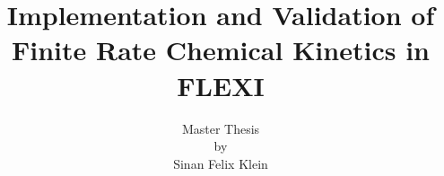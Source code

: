 \documentclass[a4paper,headsepline,bibtotoc]{scrreprt}
\begin{document}
\sloppy


\newcommand{\file}[1]{\mdseries\textsl{\textsf{#1}}}
\newcommand{\sbr}[1]{\texttt{#1}}
\newcommand{\var}[1]{\mdseries\textsl{\texttt{#1}}}
\newcommand{\cmd}[1]{\uppercase{\texttt{#1}}}

\title{Implementation and Validation of Finite Rate Chemical Kinetics in FLEXI}

\author{Master Thesis \\
        by \\
        Sinan Felix Klein}

\publishers{conducted at the \\
            Institute of Aerodynamics and Gas Dynamics \\
            University of Stuttgart.
            \\[5ex]
            Stuttgart, April 2025}

\date{}



\maketitle

\newpage
\thispagestyle{empty} 
\section*{}
\newpage

\pagestyle{plain}


\newpage
\thispagestyle{empty} 
\section*{}
\newpage



\newpage
\thispagestyle{empty} 
\section*{}
\newpage

\pagestyle{plain}

\end{document}
